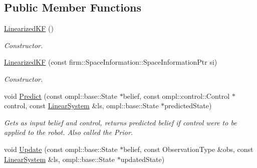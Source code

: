 \subsection*{\-Public \-Member \-Functions}
\begin{DoxyCompactItemize}
\item 
\hypertarget{class_linearized_k_f_a65e7448c5edd6d4130ce7bd1ec6e0cc5}{\hyperlink{class_linearized_k_f_a65e7448c5edd6d4130ce7bd1ec6e0cc5}{\-Linearized\-K\-F} ()}\label{class_linearized_k_f_a65e7448c5edd6d4130ce7bd1ec6e0cc5}

\begin{DoxyCompactList}\small\item\em \-Constructor. \end{DoxyCompactList}\item 
\hypertarget{class_linearized_k_f_a904ee8b6525d0358dc1ee426eb19be9b}{\hyperlink{class_linearized_k_f_a904ee8b6525d0358dc1ee426eb19be9b}{\-Linearized\-K\-F} (const firm\-::\-Space\-Information\-::\-Space\-Information\-Ptr si)}\label{class_linearized_k_f_a904ee8b6525d0358dc1ee426eb19be9b}

\begin{DoxyCompactList}\small\item\em \-Constructor. \end{DoxyCompactList}\item 
\hypertarget{class_linearized_k_f_a62bda6a7234592bad9e227d45788cf51}{void \hyperlink{class_linearized_k_f_a62bda6a7234592bad9e227d45788cf51}{\-Predict} (const ompl\-::base\-::\-State $\ast$belief, const ompl\-::control\-::\-Control $\ast$control, const \hyperlink{class_linear_system}{\-Linear\-System} \&ls, ompl\-::base\-::\-State $\ast$predicted\-State)}\label{class_linearized_k_f_a62bda6a7234592bad9e227d45788cf51}

\begin{DoxyCompactList}\small\item\em \-Gets as input belief and control, returns predicted belief if control were to be applied to the robot. \-Also called the \-Prior. \end{DoxyCompactList}\item 
\hypertarget{class_linearized_k_f_abb67e01d9e14a67de60aaa6cdde56552}{void \hyperlink{class_linearized_k_f_abb67e01d9e14a67de60aaa6cdde56552}{\-Update} (const ompl\-::base\-::\-State $\ast$belief, const \-Observation\-Type \&obs, const \hyperlink{class_linear_system}{\-Linear\-System} \&ls, ompl\-::base\-::\-State $\ast$updated\-State)}\label{class_linearized_k_f_abb67e01d9e14a67de60aaa6cdde56552}


\end{DoxyCompactItemize}
